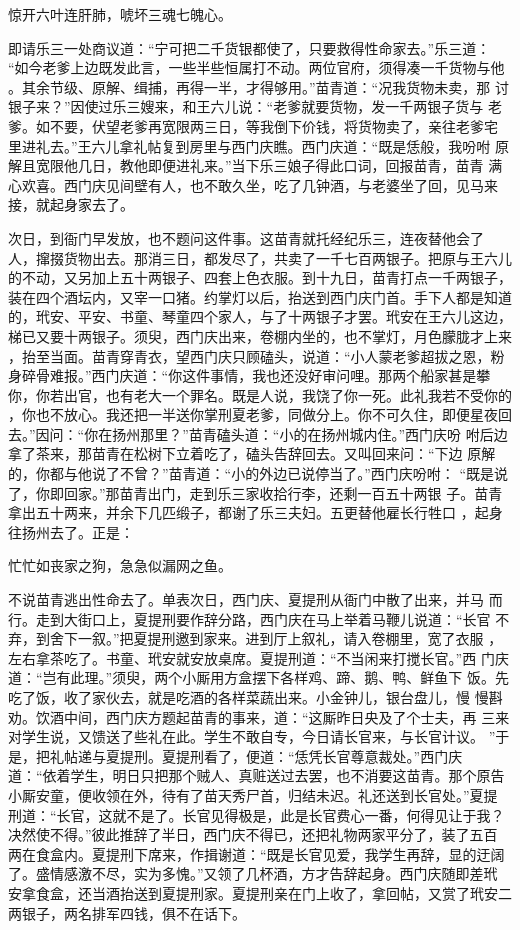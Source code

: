 惊开六叶连肝肺，唬坏三魂七魄心。

即请乐三一处商议道：“宁可把二千货银都使了，只要救得性命家去。”乐三道：
“如今老爹上边既发此言，一些半些恒属打不动。两位官府，须得凑一千货物与他
。其余节级、原解、缉捕，再得一半，才得够用。”苗青道：“况我货物未卖，那
讨银子来？”因使过乐三嫂来，和王六儿说：“老爹就要货物，发一千两银子货与
老爹。如不要，伏望老爹再宽限两三日，等我倒下价钱，将货物卖了，亲往老爹宅
里进礼去。”王六儿拿礼帖复到房里与西门庆瞧。西门庆道：“既是恁般，我吩咐
原解且宽限他几日，教他即便进礼来。”当下乐三娘子得此口词，回报苗青，苗青
满心欢喜。西门庆见间壁有人，也不敢久坐，吃了几钟酒，与老婆坐了回，见马来
接，就起身家去了。

次日，到衙门早发放，也不题问这件事。这苗青就托经纪乐三，连夜替他会了
人，撺掇货物出去。那消三日，都发尽了，共卖了一千七百两银子。把原与王六儿
的不动，又另加上五十两银子、四套上色衣服。到十九日，苗青打点一千两银子，
装在四个酒坛内，又宰一口猪。约掌灯以后，抬送到西门庆门首。手下人都是知道
的，玳安、平安、书童、琴童四个家人，与了十两银子才罢。玳安在王六儿这边，
梯已又要十两银子。须臾，西门庆出来，卷棚内坐的，也不掌灯，月色朦胧才上来
，抬至当面。苗青穿青衣，望西门庆只顾磕头，说道：“小人蒙老爹超拔之恩，粉
身碎骨难报。”西门庆道：“你这件事情，我也还没好审问哩。那两个船家甚是攀
你，你若出官，也有老大一个罪名。既是人说，我饶了你一死。此礼我若不受你的
，你也不放心。我还把一半送你掌刑夏老爹，同做分上。你不可久住，即便星夜回
去。”因问：“你在扬州那里？”苗青磕头道：“小的在扬州城内住。”西门庆吩
咐后边拿了茶来，那苗青在松树下立着吃了，磕头告辞回去。又叫回来问：“下边
原解的，你都与他说了不曾？”苗青道：“小的外边已说停当了。”西门庆吩咐：
“既是说了，你即回家。”那苗青出门，走到乐三家收拾行李，还剩一百五十两银
子。苗青拿出五十两来，并余下几匹缎子，都谢了乐三夫妇。五更替他雇长行牲口
，起身往扬州去了。正是：

忙忙如丧家之狗，急急似漏网之鱼。

不说苗青逃出性命去了。单表次日，西门庆、夏提刑从衙门中散了出来，并马
而行。走到大街口上，夏提刑要作辞分路，西门庆在马上举着马鞭儿说道：“长官
不弃，到舍下一叙。”把夏提刑邀到家来。进到厅上叙礼，请入卷棚里，宽了衣服
，左右拿茶吃了。书童、玳安就安放桌席。夏提刑道：“不当闲来打搅长官。”西
门庆道：“岂有此理。”须臾，两个小厮用方盒摆下各样鸡、蹄、鹅、鸭、鲜鱼下
饭。先吃了饭，收了家伙去，就是吃酒的各样菜蔬出来。小金钟儿，银台盘儿，慢
慢斟劝。饮酒中间，西门庆方题起苗青的事来，道：“这厮昨日央及了个士夫，再
三来对学生说，又馈送了些礼在此。学生不敢自专，今日请长官来，与长官计议。
”于是，把礼帖递与夏提刑。夏提刑看了，便道：“恁凭长官尊意裁处。”西门庆
道：“依着学生，明日只把那个贼人、真赃送过去罢，也不消要这苗青。那个原告
小厮安童，便收领在外，待有了苗天秀尸首，归结未迟。礼还送到长官处。”夏提
刑道：“长官，这就不是了。长官见得极是，此是长官费心一番，何得见让于我？
决然使不得。”彼此推辞了半日，西门庆不得已，还把礼物两家平分了，装了五百
两在食盒内。夏提刑下席来，作揖谢道：“既是长官见爱，我学生再辞，显的迂阔
了。盛情感激不尽，实为多愧。”又领了几杯酒，方才告辞起身。西门庆随即差玳
安拿食盒，还当酒抬送到夏提刑家。夏提刑亲在门上收了，拿回帖，又赏了玳安二
两银子，两名排军四钱，俱不在话下。

